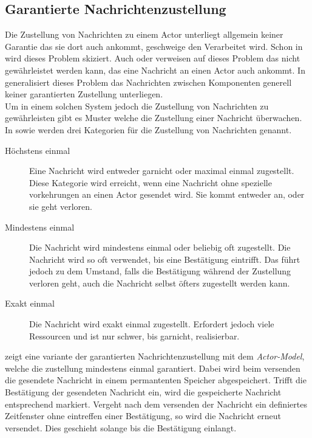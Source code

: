\subsection{Garantierte Nachrichtenzustellung}\label{sec:actor:patterns:guaranteedDelivery}
Die Zustellung von Nachrichten zu einem Actor unterliegt allgemein keiner Garantie das sie dort auch ankommt, geschweige den Verarbeitet wird. Schon in \cite{Agha1985ConcurrentParallelism} wird dieses Problem skiziert. Auch \cite{Vernon2015ReactiveAkka} oder \cite{CloudComputingPatterns2014} verweisen auf dieses Problem das nicht gewährleistet werden kann, das eine Nachricht an einen Actor auch ankommt. In \cite{CloudComputingPatterns2014} generalisiert dieses Problem das Nachrichten zwischen Komponenten generell keiner garantierten Zustellung unterliegen. \\
Um in einem solchen System jedoch die Zustellung von Nachrichten zu gewährleisten gibt es Muster welche die Zustellung einer Nachricht überwachen. In \cite{messagedeliveryreliabilityakkadocumentation} sowie \cite{hughmckee_2017} werden drei Kategorien für die Zustellung von Nachrichten genannt.
\begin{description}
    \item [Höchstens einmal] Eine Nachricht wird entweder garnicht oder maximal einmal zugestellt. Diese Kategorie wird erreicht, wenn eine Nachricht ohne spezielle vorkehrungen an einen Actor gesendet wird. Sie kommt entweder an, oder sie geht verloren.
    \item [Mindestens einmal] Die Nachricht wird mindestens einmal oder beliebig oft zugestellt. Die Nachricht wird so oft verwendet, bis eine Bestätigung eintrifft. Das führt jedoch zu dem Umstand, falls die Bestätigung während der Zustellung verloren geht, auch die Nachricht selbst öfters zugestellt werden kann.
    \item [Exakt einmal] Die Nachricht wird exakt einmal zugestellt. Erfordert jedoch viele Ressourcen und ist nur schwer, bis garnicht, realisierbar.
\end{description}
\cite{Vernon2015ReactiveAkka} zeigt eine variante der garantierten Nachrichtenzustellung mit dem \textit{Actor-Model}, welche die zustellung mindestens einmal garantiert. Dabei wird beim versenden die gesendete Nachricht in einem permantenten Speicher abgespeichert. Trifft die Bestätigung der gesendeten Nachricht ein, wird die gespeicherte Nachricht entsprechend markiert. Vergeht nach dem versenden der Nachricht ein definiertes Zeitfenster ohne eintreffen einer Bestätigung, so wird die Nachricht erneut versendet. Dies geschieht solange bis die Bestätigung einlangt. \\
